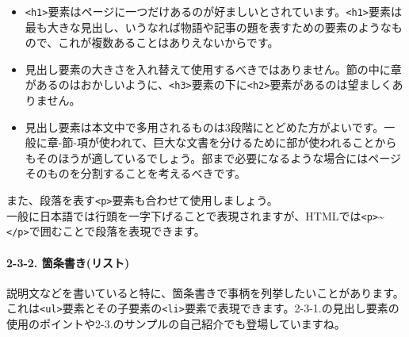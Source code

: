 \begin{itemize}
\tightlist
\item
  \texttt{\textless{}h1\textgreater{}}要素はページに一つだけあるのが好ましいとされています。\texttt{\textless{}h1\textgreater{}}要素は最も大きな見出し、いうなれば物語や記事の題を表すための要素のようなもので、これが複数あることはありえないからです。\\
\item
  見出し要素の大きさを入れ替えて使用するべきではありません。節の中に章があるのはおかしいように、\texttt{\textless{}h3\textgreater{}}要素の下に\texttt{\textless{}h2\textgreater{}}要素があるのは望ましくありません。\\
\item
  見出し要素は本文中で多用されるものは3段階にとどめた方がよいです。一般に章-節-項が使われて、巨大な文書を分けるために部が使われることからもそのほうが適しているでしょう。部まで必要になるような場合にはページそのものを分割することを考えるべきです。
\end{itemize}

また、段落を表す\texttt{\textless{}p\textgreater{}}要素も合わせて使用しましょう。\\
一般に日本語では行頭を一字下げることで表現されますが、HTMLでは\texttt{\textless{}p\textgreater{}}\textasciitilde{}\texttt{\textless{}/p\textgreater{}}で囲むことで段落を表現できます。

\paragraph{2-3-2.
箇条書き(リスト)}\label{ux7b87ux6761ux66f8ux304dux30eaux30b9ux30c8}

説明文などを書いていると特に、箇条書きで事柄を列挙したいことがあります。
これは\texttt{\textless{}ul\textgreater{}}要素とその子要素の\texttt{\textless{}li\textgreater{}}要素で表現できます。2-3-1.の見出し要素の使用のポイントや2-3.のサンプルの自己紹介でも登場していますね。

